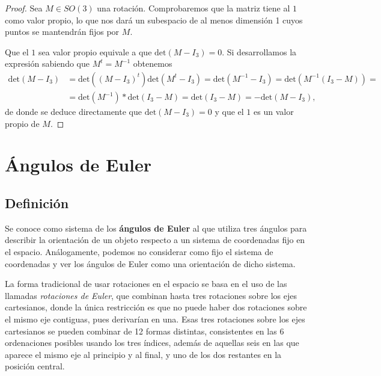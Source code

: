\documentclass{article}
\theoremstyle{plain}
\theoremstyle{definition}
\theoremstyle{remark}
\begin{document}
\begin{proof}
  Sea $ M \in SO(3)$ una rotación. Comprobaremos que la matriz tiene
  al $1$ como valor propio, lo que nos dará un subespacio de al menos
  dimensión 1 cuyos puntos se mantendrán fijos por $M$.

  Que el $1$ sea valor propio equivale a que $\mathrm{det}(M-I_3)=0$.
  Si desarrollamos la expresión sabiendo que $M^t = M^{-1}$ obtenemos
  \[\begin{aligned}
    \mathrm{det}(M - I_3) &=
    \mathrm{det}((M - I_3)^t) \mathrm{det}(M^t - I_3) =
    \mathrm{det}(M^{-1} - I_3) =
    \mathrm{det}(M^{-1}(I_3 - M)) =\\
    &= \mathrm{det}(M^{-1}) * \mathrm{det}(I_3 - M) =
    \mathrm{det}(I_3 - M) = -\mathrm{det}(M - I_3),
  \end{aligned}\]
  de donde se deduce directamente que $\mathrm{det}(M - I_3) = 0$ y que el $1$
  es un valor propio de $M$.
\end{proof}


\section{Ángulos de Euler}
\subsection{Definición}

Se conoce como sistema de los \textbf{ángulos de Euler} al que utiliza
tres ángulos para describir la orientación de un objeto respecto a un
sistema de coordenadas fijo en el espacio. Análogamente, podemos no
considerar como fijo el sistema de coordenadas y ver los ángulos de
Euler como una orientación de dicho sistema. %

La forma tradicional de usar rotaciones en el espacio se basa en el
uso de las llamadas \textit{rotaciones de Euler}, que combinan hasta tres
rotaciones sobre los ejes cartesianos, donde la única restricción es
que no puede haber dos rotaciones sobre el mismo eje contiguas, pues
derivarían en una. Esas tres rotaciones sobre los ejes cartesianos se
pueden combinar de 12 formas distintas, consistentes en las 6
ordenaciones posibles usando los tres índices, además de aquellas seis
en las que aparece el mismo eje al principio y al final, y uno de los
dos restantes en la posición central. %

\end{document}
